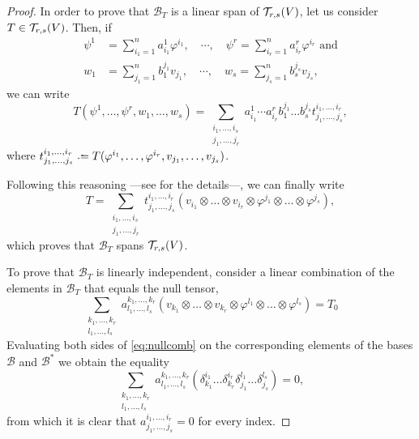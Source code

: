 \begin{proof}

	In order to prove that $\mathcal{B}_T$ is a linear span of ${\mathcal T}_{r,s}(V)$, let us consider $T\in{\mathcal T}_{r,s}(V)$. Then, if
	\begin{align*}
		\psi^1& = \sum_{i_1 = 1}^n a_{i_1}^1 \varphi^{i_1},\quad \cdots,\quad \psi^r = \sum_{i_r = 1}^n a_{i_r}^r \varphi^{i_r} \textrm{ and} \\
		w_1 &= \sum_{j_1 = 1}^n b^{j_1}_1 v_{j_1},\quad \cdots,\quad w_s = \sum_{j_s = 1}^n b^{j_s}_s v_{j_s},
	\end{align*}
	we can write
	\[
		T(\psi^1, \dots, \psi^r, w_1, \dots, w_s) = \sum_{\substack{i_1,\dots,i_s\\j_1,\dots,j_r}} a_{i_1}^1 \cdots a_{i_r}^r b^{j_1}_1 \dots b^{j_s}_s t_{j_1, \dots, j_s}^{i_1, \dots, i_r},
	\]
	where $t_{j_1, \dots, j_s}^{i_1, \dots, i_r} \defeq T(\varphi^{i_1}, \dots, \varphi^{i_r}, v_{j_1}, \dots, v_{j_s})$.
	
	Following this reasoning ---see \cite{romero86} for the details---, we can finally write
	\[
		T = \sum_{\substack{i_1,\dots,i_s\\j_1,\dots,j_r}} t_{j_1, \dots, j_s}^{i_1, \dots, i_r} \left( v_{i_1} \otimes \dots \otimes v_{i_r} \otimes \varphi^{j_1} \otimes \dots \otimes \varphi^{j_s} \right),
	\]
	which proves that $\mathcal{B}_T$ spans ${\mathcal T}_{r,s}(V)$.
	
	To prove that $\mathcal{B}_T$ is linearly independent, consider a linear combination of the elements in $\mathcal{B}_T$ that equals the null tensor,
	\begin{equation}
		\label{eq:nullcomb}
		\sum_{\substack{k_1,\dots,k_r\\l_1,\dots,l_s}} a^{k_1,\dots,k_r}_{l_1,\dots,l_s} \left( v_{k_1} \otimes \dots \otimes v_{k_r} \otimes \varphi^{l_1} \otimes \dots \otimes \varphi^{l_s} \right) = T_0
	\end{equation}
	Evaluating both sides of \autoref{eq:nullcomb} on the corresponding elements of the bases $\mathcal{B}$ and $\mathcal{B}^*$ we obtain the equality
	\[
		\sum_{\substack{k_1,\dots,k_r\\l_1,\dots,l_s}} a^{k_1,\dots,k_r}_{l_1,\dots,l_s} \left( \delta^{i_1}_{k_1} \dots \delta^{i_r}_{k_r} \delta^{l_1}_{j_1} \dots \delta^{l_s}_{j_s} \right) = 0,
	\]
	from which it is clear that $a^{i_1,\dots,i_r}_{j_1,\dots,j_s} = 0$ for every index.
\end{proof}

